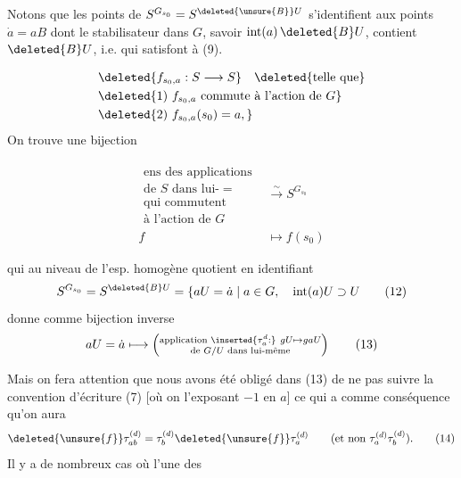 Notons que les points de $S^{G_{s_0}}=S^{\deleted{\unsure{B}}U}$ s'identifient aux points $\dot a=aB$  dont le stabilisateur dans $G$, savoir $\operatorname{int}(a)\,\deleted{B}U$, contient $\deleted{B}U$, i.e. qui satisfont à (9).

\[
\begin{aligned}
&\deleted{f_{s_0,a}:S\longrightarrow S}\quad\deleted{\text{telle que}}\\
&\deleted{\text{1) }f_{s_0,a}\text{ commute à l'action de }G}\\
&\deleted{\text{2) }f_{s_0,a}(s_0)=a,}
\end{aligned}
\]
On trouve une bijection  

\[
\begin{aligned}
\substack{\text{ens des applications}\\\text{de }S\text{ dans lui-} =\\\text{qui commutent}\\\text{à l'action de }G}&\xrightarrow{\sim}S^{G_{s_0}}\\
f&\longmapsto f(s_0)
\end{aligned}\tag*{(11)}
\]

qui au niveau de l'esp. homogène quotient en  identifiant
\[
S^{G_{s_0}}=S^{\deleted{B}U}=\{aU=\dot a\mid a\in G,\quad\operatorname{int}(a)U\supset U\tag*{(12)}
\]
donne comme bijection inverse
\[
aU=\dot a\longmapsto
\left(\substack{\text{application }\inserted{\tau_a^{d}:}\ gU\mapsto gaU\\\text{de }G/U\text{ dans lui-même}}\right)\tag*{(13)}
\]

Mais on fera attention que nous avons été obligé dans (13) de ne pas suivre la convention d'écriture (7) [où on  l'exposant $-1$ en $a$] ce qui a comme conséquence qu'on aura
\[
\deleted{\unsure{f}}\tau_{ab}^{(d)}=\tau_b^{(d)}\deleted{\unsure{f}}\tau_a^{(d)}\qquad(\text{et non }\tau_a^{(d)}\tau_b^{(d)}).\tag*{(14)}
\]
Il y a de nombreux cas où l'une des

